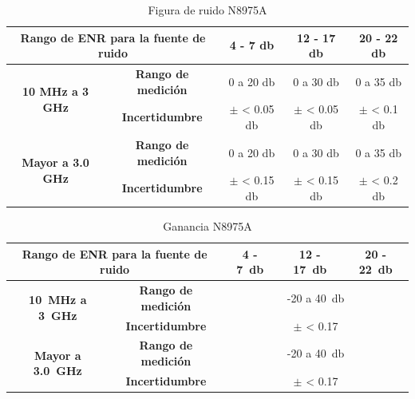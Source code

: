 \begin{table}
	\centering
	\begin{tabular}{ccccc}
		\toprule
		\multicolumn{2}{c}{\bfseries Rango de ENR para la fuente   de ruido} &
		{\bfseries 4 - 7 \si{\decibel}} & 
		{\bfseries 12 - 17 \si{\decibel}} & 
		{\bfseries 20 - 22 \si{\decibel}} \\
		\midrule
		\multirow{2}{*}{\bfseries 10 \si{\mega\hertz} a 3 \si{\giga\hertz}} & {\bfseries Rango de medición} 
		& 0 a 20 \si{\decibel} 	& 0 a 30 \si{\decibel} & 0 a 35 \si{\decibel} \\
		\cmidrule{2-5}
		& {\bfseries Incertidumbre} 
		& $\pm$ < 0.05 \si{\decibel} 
		& $\pm$ < 0.05 \si{\decibel} 
		& $\pm$ < 0.1 \si{\decibel} \\
		\midrule
		\multirow{2}{*}{\bfseries Mayor a 3.0 \si{\giga\hertz}} 
		& {\bfseries Rango de medición} 
		& 0 a 20 \si{\decibel} 	
		& 0 a 30 \si{\decibel} 
		& 0 a 35 \si{\decibel} \\
					\cmidrule{2-5}
		& {\bfseries Incertidumbre} 
		& $\pm$ < 0.15 \si{\decibel} 
		& $\pm$ < 0.15 \si{\decibel} 
		& $\pm$ < 0.2 \si{\decibel} \\	
		\bottomrule	
		
	\end{tabular}
	\caption{Figura de ruido N8975A}
	\label{Tab: FiguraRuidoN8975A}
\end{table}

\begin{table}
	\centering
	\begin{tabular}{ccccc}
		\toprule
		\multicolumn{2}{c}{\bfseries Rango de ENR para la fuente   de ruido} &
		{\bfseries 4 - \SI{7}{\decibel}} & 
		{\bfseries 12 - \SI{17}{\decibel}} & 
		{\bfseries 20 - \SI{22}{\decibel}} \\	
		\midrule
		\multirow{2}{*}{\bfseries \SI{10}{\mega\hertz} a \SI{3} {\giga\hertz}} 
			& {\bfseries Rango de medición} 
		& \multicolumn{3}{c}{-20 a \SI{+40}{\decibel}} \\
		\cmidrule{2-5}			
		& {\bfseries Incertidumbre} 
		& \multicolumn{3}{c}{$\pm$ < 0.17} \\		
		\midrule
		\multirow{2}{*}{\bfseries Mayor a \SI{3.0}{\giga\hertz}} 
			& {\bfseries Rango de medición} 
		& \multicolumn{3}{c}{-20 a \SI{+40}{\decibel}} \\
		\cmidrule{2-5}			
		& {\bfseries Incertidumbre} 
		& \multicolumn{3}{c}{$\pm$ < 0.17} \\				
		\bottomrule
	\end{tabular}
	\caption{Ganancia N8975A}
\end{table}

